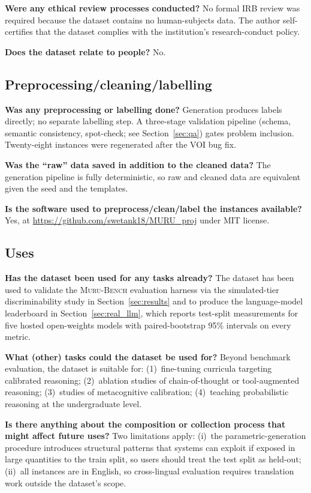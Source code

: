 \documentclass{article}
\newcommand{\muru}{\textsc{Muru-Bench}}
\begin{document}
\textbf{Were any ethical review processes conducted?}
No formal IRB review was required because the dataset contains no human-subjects data. The author self-certifies that the dataset complies with the institution's research-conduct policy.

\textbf{Does the dataset relate to people?}
No.

\subsection*{Preprocessing/cleaning/labelling}

\textbf{Was any preprocessing or labelling done?}
Generation produces labels directly; no separate labelling step. A three-stage validation pipeline (schema, semantic consistency, spot-check; see Section~\ref{sec:qa}) gates problem inclusion. Twenty-eight instances were regenerated after the VOI bug fix.

\textbf{Was the ``raw'' data saved in addition to the cleaned data?}
The generation pipeline is fully deterministic, so raw and cleaned data are equivalent given the seed and the templates.

\textbf{Is the software used to preprocess/clean/label the instances available?}
Yes, at \url{https://github.com/swetank18/MURU_proj} under MIT license.

\subsection*{Uses}

\textbf{Has the dataset been used for any tasks already?}
The dataset has been used to validate the \muru{} evaluation harness via the simulated-tier discriminability study in Section~\ref{sec:results} and to produce the language-model leaderboard in Section~\ref{sec:real_llm}, which reports test-split measurements for five hosted open-weights models with paired-bootstrap 95\% intervals on every metric.

\textbf{What (other) tasks could the dataset be used for?}
Beyond benchmark evaluation, the dataset is suitable for: (1)~fine-tuning curricula targeting calibrated reasoning; (2)~ablation studies of chain-of-thought or tool-augmented reasoning; (3)~studies of metacognitive calibration; (4)~teaching probabilistic reasoning at the undergraduate level.

\textbf{Is there anything about the composition or collection process that might affect future uses?}
Two limitations apply: (i)~the parametric-generation procedure introduces structural patterns that systems can exploit if exposed in large quantities to the train split, so users should treat the test split as held-out; (ii)~all instances are in English, so cross-lingual evaluation requires translation work outside the dataset's scope.
\end{document}
